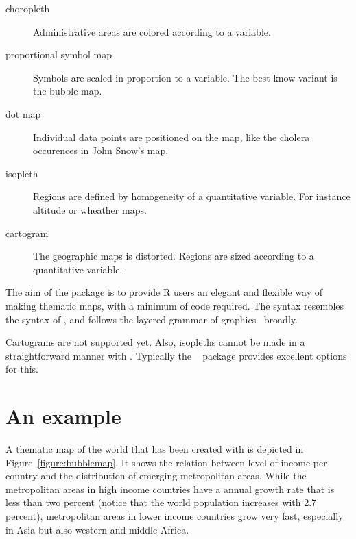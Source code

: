 \begin{description}
\item[choropleth] Administrative areas are colored according to a variable.
\item[proportional symbol map] Symbols are scaled in proportion to a variable. The best know variant is the bubble map.
\item[dot map] Individual data points are positioned on the map, like the cholera occurences in John Snow's map.
\item[isopleth] Regions are defined by homogeneity of a quantitative variable. For instance altitude or wheather maps.
\item[cartogram] The geographic maps is distorted. Regions are sized according to a quantitative variable.
\end{description}



The aim of the  package is to provide R users an elegant and flexible way of making thematic maps, with a minimum of code required. The syntax resembles the syntax of , and follows the layered grammar of graphics~\citep{wickham10} broadly. 


Cartograms are not supported yet. Also, isopleths cannot be made in a straightforward manner with . Typically the ~\citep{raster} package provides excellent options for this.





%

\section{An example}

A thematic map of the world that has been created with  is depicted in Figure~\ref{figure:bubblemap}. It shows the relation between level of income per country and the distribution of emerging metropolitan areas. While the metropolitan areas in high income countries have a annual growth rate that is less than two percent (notice that the world population increases with 2.7 percent), metropolitan areas in lower income countries grow very fast, especially in Asia but also western and middle Africa.

